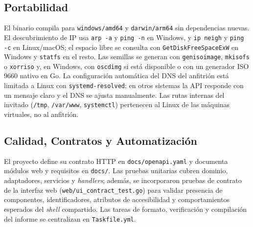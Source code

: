 \subsection{Portabilidad}
El binario compila para \texttt{windows/amd64} y \texttt{darwin/arm64} sin dependencias nuevas. El descubrimiento de IP usa \texttt{arp -a} y \texttt{ping -n} en Windows, y \texttt{ip neigh} y \texttt{ping -c} en Linux/macOS; el espacio libre se consulta con \texttt{GetDiskFreeSpaceExW} en Windows y \texttt{statfs} en el resto. Las semillas se generan con \texttt{genisoimage}, \texttt{mkisofs} o \texttt{xorriso} y, en Windows, con \texttt{oscdimg} si está disponible o con un generador ISO 9660 nativo en Go. La configuración automática del DNS del anfitrión está limitada a Linux con \texttt{systemd-resolved}; en otros sistemas la API responde con un mensaje claro y el DNS se ajusta manualmente. Las rutas internas del invitado (\texttt{/tmp}, \texttt{/var/www}, \texttt{systemctl}) pertenecen al Linux de las máquinas virtuales, no al anfitrión.

\subsection{Calidad, Contratos y Automatización}
El proyecto define su contrato HTTP en \texttt{docs/openapi.yaml} y documenta módulos web y requisitos en \texttt{docs/}. Las pruebas unitarias cubren dominio, adaptadores, servicios y \textit{handlers}; además, se incorporaron pruebas de contrato de la interfaz web (\texttt{web/ui\_contract\_test.go}) para validar presencia de componentes, identificadores, atributos de accesibilidad y comportamientos esperados del \textit{shell} compartido. Las tareas de formato, verificación y compilación del informe se centralizan en \texttt{Taskfile.yml}.
